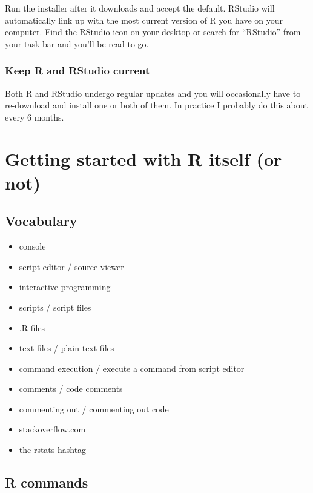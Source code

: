 \documentclass[
]{book}
\providecommand{\tightlist}{%
  \setlength{\itemsep}{0pt}\setlength{\parskip}{0pt}}
\begin{document}
Run the installer after it downloads and accept the default. RStudio will automatically link up with the most current version of R you have on your computer. Find the RStudio icon on your desktop or search for ``RStudio'' from your task bar and you'll be read to go.

\hypertarget{keep-r-and-rstudio-current}{%
\subsection{Keep R and RStudio current}\label{keep-r-and-rstudio-current}}

Both R and RStudio undergo regular updates and you will occasionally have to re-download and install one or both of them. In practice I probably do this about every 6 months.

\hypertarget{getting-started-with-r-itself-or-not}{%
\chapter*{Getting started with R itself (or not)}\label{getting-started-with-r-itself-or-not}}

\hypertarget{vocabulary-3}{%
\section*{Vocabulary}\label{vocabulary-3}}

\begin{itemize}
\tightlist
\item
  console
\item
  script editor / source viewer
\item
  interactive programming
\item
  scripts / script files
\item
  .R files
\item
  text files / plain text files
\item
  command execution / execute a command from script editor
\item
  comments / code comments
\item
  commenting out / commenting out code
\item
  stackoverflow.com
\item
  the rstats hashtag
\end{itemize}

\hypertarget{r-commands}{%
\section*{R commands}\label{r-commands}}
\end{document}
